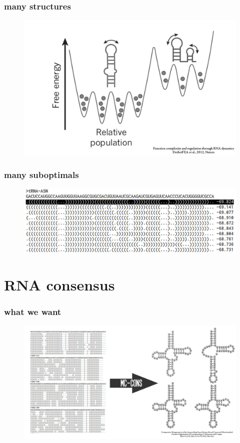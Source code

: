 \documentclass{beamer}
\begin{document}
\begin{frame}
	\frametitle{many structures}
	\begin{figure}
	\centering
	\includegraphics[scale=0.85]{figs/dynamics}
	\end{figure}
\end{frame}


\begin{frame}
	\frametitle{many suboptimals}
	\begin{figure}
	\centering
	\includegraphics[scale=0.3]{figs/subopts}
	\end{figure}
\end{frame}




\section{RNA consensus}

\begin{frame}
	\frametitle{what we want}
	\begin{figure}
	\centering
	\includegraphics[scale=0.7]{figs/problem_setting}
	\end{figure}
\end{frame}
\end{document}
